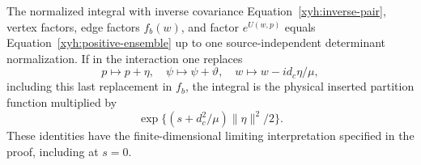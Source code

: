 \begin{proposition}
\label{xyh:compensation}
The normalized integral with inverse covariance
Equation~\eqref{xyh:inverse-pair}, vertex factors, edge factors $f_b(w)$,
and factor $e^{U(w,p)}$ equals
Equation~\eqref{xyh:positive-ensemble} up to one source-independent
determinant normalization. If in the interaction one replaces
\begin{equation}\label{xyh:offsets}
 p\mapsto p+\eta,\quad \psi\mapsto\psi+\vartheta,
 \quad w\mapsto w-i d_c\eta/\mu,
\end{equation}
including this last replacement in $f_b$, the integral is the physical
inserted partition function multiplied by
\begin{equation}\label{xyh:spin-prefactor}
 \exp\{(s+d_c^2/\mu)\|\eta\|^2/2\}.
\end{equation}
These identities have the finite-dimensional limiting interpretation
specified in the proof, including at $s=0$.
\end{proposition}
